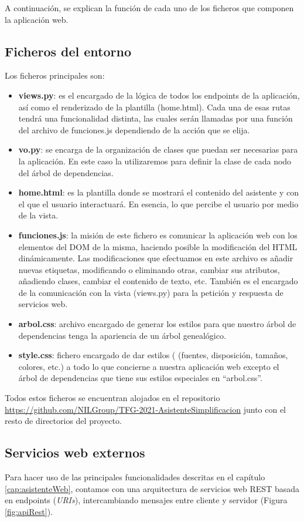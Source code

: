 A continuación, se explican la función de cada uno de los ficheros que componen la aplicación web.

\subsection{Ficheros del entorno}

Los ficheros principales son:
\begin{itemize}
	\item \textbf{views.py}: es el encargado de la lógica de todos los endpoints de la aplicación, así como el renderizado de la plantilla (home.html). Cada una de esas rutas tendrá una funcionalidad distinta, las cuales serán llamadas por una función del archivo de funciones.js dependiendo de la acción que se elija.
	\item \textbf{vo.py}: se encarga de la organización de clases que puedan ser necesarias para la aplicación. En este caso la utilizaremos para definir la clase de cada nodo del árbol de dependencias.
	\item \textbf{home.html}: es la plantilla donde se mostrará el contenido del asistente y con el que el usuario interactuará. En esencia, lo que percibe el usuario por medio de la vista.
	\item \textbf{funciones.js}: la misión de este fichero es comunicar la aplicación web con los elementos del DOM de la misma, haciendo posible la modificación del HTML dinámicamente. Las modificaciones que efectuamos en este archivo es añadir nuevas etiquetas, modificando o eliminando otras, cambiar sus atributos, añadiendo clases, cambiar el contenido de texto, etc. También es el encargado de la comunicación con la vista (views.py) para la petición y respuesta de servicios web.
	\item \textbf{arbol.css}: archivo encargado de generar los estilos para que nuestro árbol de dependencias tenga la apariencia de un árbol genealógico.
	\item \textbf{style.css}: fichero encargado de dar estilos ( (fuentes, disposición, tamaños, colores, etc.) a todo lo que concierne a nuestra aplicación web excepto el árbol de dependencias que tiene sus estilos especiales en ``arbol.css''. 
\end{itemize}

 Todos estos ficheros se encuentran alojados en el repositorio \url{https://github.com/NILGroup/TFG-2021-AsistenteSimplificacion} junto con el resto de directorios del proyecto.

\subsection{Servicios web externos}\label{sec:serviciosWebExternos}
Para hacer uso de las principales funcionalidades descritas en el capítulo \ref{cap:asistenteWeb}, contamos con una arquitectura de servicios web REST basada en endpoints (\textit{URIs}), intercambiando mensajes entre cliente y servidor (Figura \ref{fig:apiRest}). 

